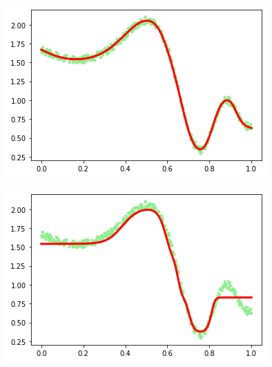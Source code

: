 \documentclass[french,12pt]{article}
\begin{document}
\begin{figure}[ht]
\centering
\begin{minipage}{.33\textwidth}
	\centering
	\includegraphics[width=\textwidth]{nn_batch.png}
	\label{fig:nn_batch}
\end{minipage}
\hfill
\begin{minipage}{.33\textwidth}
	\centering
	\includegraphics[width=\textwidth]{nn_incr.png}
	\label{fig:nn_incr}
\end{minipage}\hfill
\begin{minipage}{.33\textwidth}
	\centering

\end{minipage}
\end{figure}
\end{document}
